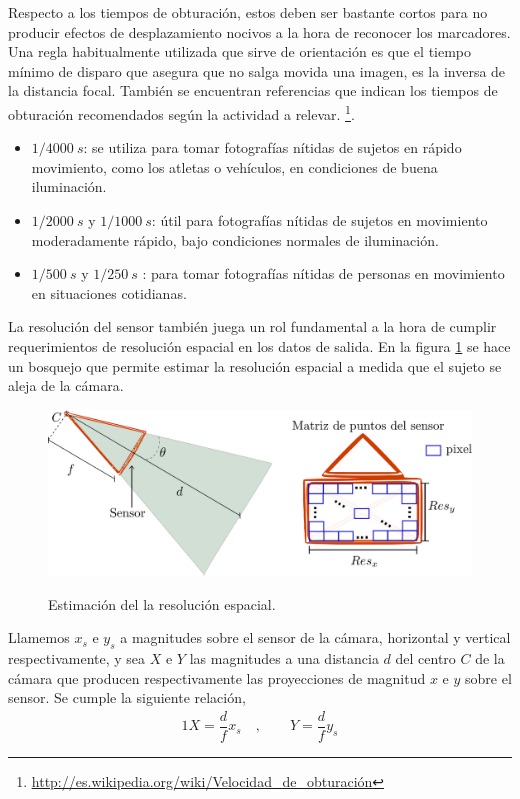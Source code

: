 Respecto a los tiempos de obturación, estos deben ser bastante cortos  para no producir efectos de desplazamiento nocivos a la hora de reconocer los marcadores.
Una regla habitualmente utilizada que sirve de orientación es que el tiempo mínimo de disparo que asegura que no salga movida una imagen, es la inversa de la distancia focal. También se encuentran referencias que indican los tiempos de obturación recomendados según la actividad a relevar. \footnote{\textcolor{blue}{\underline{\url{http://es.wikipedia.org/wiki/Velocidad_de_obturación}}}}.
\begin{itemize}
\item $1 / 4000~ s$:  se utiliza para tomar fotografías nítidas de sujetos en rápido movimiento, como los atletas o vehículos, en condiciones de buena iluminación.
\item $1 / 2000 ~s$ y $1/ 1000~s$: útil  para fotografías nítidas de sujetos en movimiento moderadamente rápido, bajo condiciones normales de iluminación.
\item $1 / 500~s$ y $1/ 250~s$ :  para tomar fotografías nítidas de personas en movimiento en situaciones cotidianas.
\end{itemize}
 
 
 La resolución del sensor también juega un rol fundamental a la hora de cumplir requerimientos de resolución espacial en los datos de salida.
 En la figura \ref{estimacion_resolucion} se hace un bosquejo que permite estimar la resolución espacial a medida que el sujeto se aleja de la cámara.
 
\begin{figure}[H]
  \centering
  {\includegraphics[scale=0.5]{img/Base_Datos/camara_resolucion.eps}\label{peladoOriginalintro}}      
  \caption{Estimación del la resolución espacial.}
  \label{estimacion_resolucion}
\end{figure} 

Llamemos $x_s$ e $y_s$ a magnitudes sobre el sensor de la cámara, horizontal y vertical respectivamente, y sea $X$ e $Y$ las magnitudes a una distancia $d$ del centro $C$ de la cámara que producen respectivamente las proyecciones de magnitud $x$ e $y$ sobre el sensor.
Se cumple la siguiente relación,
\begin{alignat*}{1}
X = \dfrac{d}{f}x_s&~, \quad \quad Y = \dfrac{d}{f}y_s
\end{alignat*}

